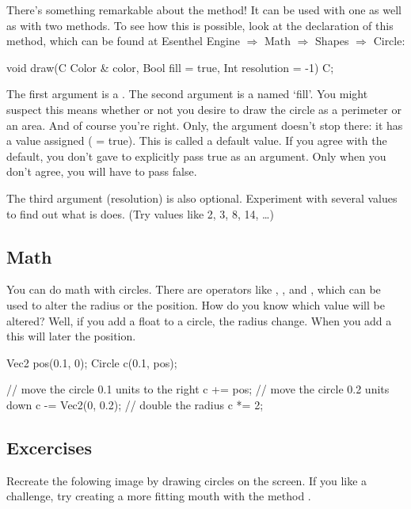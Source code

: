 There's something remarkable about the  method! It can be used with one as well as with two methods. To see how this is possible, look at the declaration of this method, which can be found at Esenthel Engine $\Rightarrow$ Math $\Rightarrow$ Shapes $\Rightarrow$ Circle:

\begin{code}
void draw(C Color & color, Bool fill = true, Int resolution = -1) C;
\end{code}

The first argument is a . The second argument is a  named `fill'. You might suspect this means whether or not you desire to draw the circle as a perimeter or an area. And of course you're right. Only, the argument doesn't stop there: it has a value assigned ( = true). This is called a default value. If you agree with the default, you don't gave to explicitly pass true as an argument. Only when you don't agree, you will have to pass false.

\begin{note}
The third argument (resolution) is also optional. Experiment with several values to find out what is does. (Try values like 2, 3, 8, 14, \ldots)
\end{note}

\subsection{Math}
You can do math with circles. There are operators like \eeOpp{+=}, \eeOpp{-=}, \eeOpp{/=} and \eeOpp{*=}, which can be used to alter the radius or the position. How do you know which value will be altered? Well, if you add a float to a circle, the radius change. When you add a  this will later the position.

\begin{code}
Vec2 pos(0.1, 0);
Circle c(0.1, pos);

// move the circle 0.1 units to the right
c += pos;
// move the circle 0.2 units down
c -= Vec2(0, 0.2);
// double the radius
c *= 2;
\end{code}

\subsection{Excercises}
Recreate the folowing image by drawing circles on the screen. If you like a challenge, try creating a more fitting mouth with the method .


